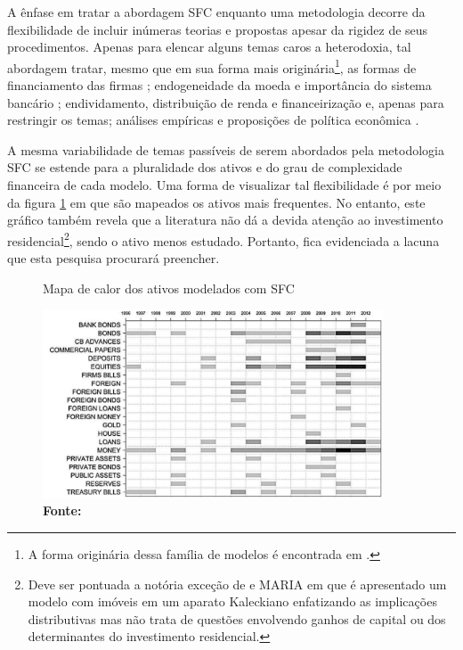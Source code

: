 A ênfase em tratar a abordagem SFC enquanto uma metodologia decorre da flexibilidade de incluir inúmeras teorias e propostas apesar da rigidez de seus procedimentos. Apenas para elencar alguns temas caros a heterodoxia, tal abordagem tratar, mesmo que em sua forma mais originária\footnote{A forma originária dessa família de modelos é encontrada em \textcite{godley_macroeconomics_1983}.}, as formas de financiamento das firmas \cites{asimakopulos_kalecki_1983}{skott_finance_1988}{messori_financing_1991}; endogeneidade da moeda e importância do sistema bancário \cites{messori_financing_1991}{dow_horizontalism:_1996}{arestis_theoretical_1996}{godley_money_1999}{lavoie_note_1999}{lima_macrodynamics_2007}; endividamento, distribuição de renda e financeirização \cites{palley_inside_1996}{wolfson_irving_1996}{palley_money_1997}{palley_financial_2002}{dos_santos_revisiting_2009}{palley_inside_2010}{hein_finance-dominated_2012} e, apenas para restringir os temas; análises empíricas e proposições de política econômica \cites{godley_seven_1999}{godley_fiscal_2007}{godley_simple_2007}{arestis_income_2011}{zezza_design_2019}. 

A mesma variabilidade de temas passíveis de serem abordados pela metodologia SFC se estende para a pluralidade dos ativos e do grau de complexidade financeira de cada modelo. Uma forma de visualizar tal flexibilidade é por meio da figura \ref{Heatmap} em que são mapeados os ativos mais frequentes. No entanto, este gráfico também revela que a literatura não dá a devida atenção ao investimento residencial\footnote{Deve ser pontuada a notória exceção de \textcite{zezza_u.s._2008} e MARIA em que é apresentado um modelo com imóveis em um aparato Kaleckiano enfatizando as implicações distributivas mas não trata de questões envolvendo ganhos de capital ou dos determinantes do investimento residencial.}, sendo o ativo menos estudado. Portanto, fica evidenciada a lacuna que esta pesquisa procurará preencher.

\begin{figure}
	\centering
	\caption{Mapa de calor dos ativos modelados com SFC}
	\label{Heatmap}
	\includegraphics[width = 0.9\textwidth]{../../Escrita_Dissertacao/Da_Silveira_Dissertacao_Atual/Modelo/Caverzassi_Heatmap.png}
	\caption*{\textbf{Fonte:} \textcite[p.~4]{caverzasi_stock-flow_2013}}
\end{figure}

